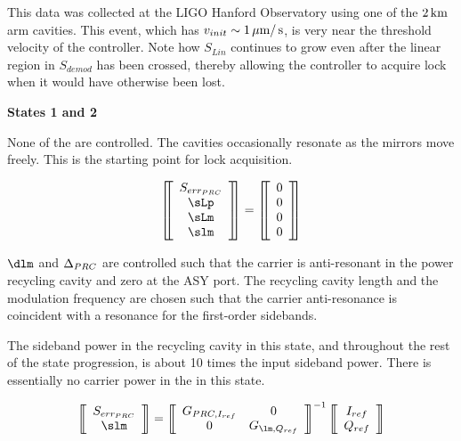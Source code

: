 \documentclass[12pt]{article}
\newcommand{\tit}[1]{\begin{center}\textbf{\Huge{#1}}\end{center}\vspace{1ex}}
\begin{document}
 This data was collected at the LIGO Hanford Observatory using one of the
  $2 \,\mbox{km}$ arm cavities.
 This event, which has $v_{init} \sim 1 \,\mbox{$\mu$m}/\,\mbox{s}$, is very near the
  threshold velocity of the controller.
 Note how $S_{Lin}$ continues to grow even after the
  linear region in $S_{demod}$ has been crossed,
  thereby allowing the controller to acquire lock when it would have
  otherwise been lost.

\newpage
\tit{States 1 and 2}



None of the \dsf{} are controlled.
The cavities occasionally resonate as the mirrors move freely.
This is the starting point for lock acquisition.

\begin{equation*}
\matrixBegin{c}
 \slp \\
 \sLp \\
 \sLm \\
 \slm \\
\matrixEnd
 =
\matrixBegin{c}
 0 \\
 0 \\
 0 \\
 0 \\
\matrixEnd
\end{equation*}

\vspace{0.5in}



$\dlm$ and $\Delta_{PRC}$
 are controlled such that the carrier is anti-resonant in the
 power recycling cavity and zero at the ASY port.
The recycling cavity length and the modulation frequency are
 chosen such that the carrier anti-resonance is
 coincident with a resonance for the first-order sidebands.

The sideband power in the recycling cavity in this state,
 and throughout the rest of the state progression,
 is about 10 times the input sideband power.
There is essentially no carrier power in the \ifo{} in this state.

\begin{equation*}
\matrixBegin{c}
 \slp \\
 \slm \\
\matrixEnd
 =
\matrixBegin{cc}
 G_{\lp, I_{ref}} & 0 \\
 0                & G_{\lm, Q_{ref}} \\
\matrixEnd^{-1}
\matrixBegin{c}
 I_{ref} \\
 Q_{ref} \\
\matrixEnd
\end{equation*}
\end{document}
